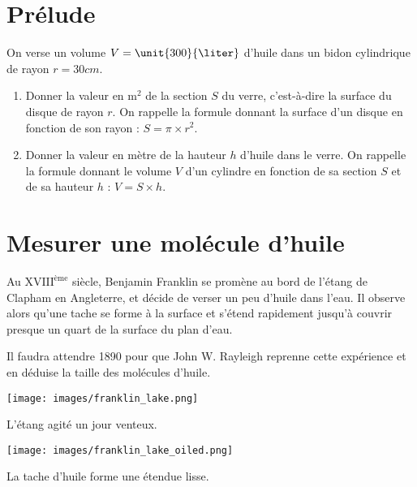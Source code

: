 \documentclass[12pt,a4paper]{article}
\begin{document}
\section*{Prélude}

On verse un volume $V = \unit{300}{\liter}$ d'huile dans un bidon cylindrique de rayon $r = \unit{30}{cm}$.
\begin{enumerate}
\item Donner la valeur en $\mathrm{m^2}$ de la section $S$ du verre, c'est-à-dire la surface du disque de rayon $r$.
On rappelle la formule donnant la surface d'un disque en fonction de son rayon : $S = \pi \times r^2$.

\item Donner la valeur en mètre de la hauteur $h$ d'huile dans le verre.
On rappelle la formule donnant le volume $V$ d'un cylindre en fonction de sa section $S$ et de sa hauteur $h$ : $V = S \times h$.
\label{quest:volume}
\end{enumerate}

\section*{Mesurer une molécule d'huile}

Au $\text{XVIII}^\text{ème}$ siècle, Benjamin Franklin se promène au bord de l'étang de Clapham en Angleterre, et décide de verser un peu d'huile dans l'eau. Il observe alors qu'une tache se forme à la surface et s'étend rapidement jusqu'à couvrir presque un quart de la surface du plan d'eau.

Il faudra attendre 1890 pour que John W. Rayleigh reprenne cette expérience et en déduise la taille des molécules d'huile.

\begin{multicols}{2}
\center
\texttt{[image: images/franklin\_lake.png]}

L'étang agité un jour venteux.

\texttt{[image: images/franklin\_lake\_oiled.png]}

La tache d'huile forme une étendue lisse.
\end{multicols}
\end{document}
